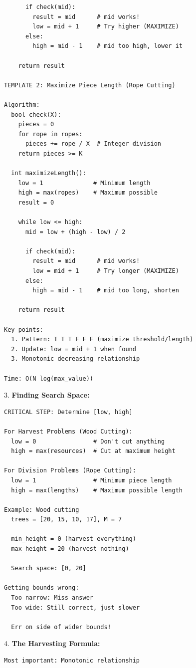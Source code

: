 \documentclass[11pt,a4paper,oneside]{book}
\begin{document}
\begin{tcolorbox}[
    enhanced,breakable,
    colback=white,
    colframe=deepblue,
    boxrule=1.5pt,
    arc=3mm,
    title=\textbf{The Harvesting and Division Paradigm}
]
\begin{verbatim}
      if check(mid):
        result = mid      # mid works!
        low = mid + 1     # Try higher (MAXIMIZE)
      else:
        high = mid - 1    # mid too high, lower it
    
    return result

TEMPLATE 2: Maximize Piece Length (Rope Cutting)

Algorithm:
  bool check(X):
    pieces = 0
    for rope in ropes:
      pieces += rope / X  # Integer division
    return pieces >= K
  
  int maximizeLength():
    low = 1              # Minimum length
    high = max(ropes)    # Maximum possible
    result = 0
    
    while low <= high:
      mid = low + (high - low) / 2
      
      if check(mid):
        result = mid      # mid works!
        low = mid + 1     # Try longer (MAXIMIZE)
      else:
        high = mid - 1    # mid too long, shorten
    
    return result

Key points:
  1. Pattern: T T T F F F (maximize threshold/length)
  2. Update: low = mid + 1 when found
  3. Monotonic decreasing relationship

Time: O(N log(max_value))
\end{verbatim}

3. \textbf{Finding Search Space:}
\begin{verbatim}
CRITICAL STEP: Determine [low, high]

For Harvest Problems (Wood Cutting):
  low = 0                # Don't cut anything
  high = max(resources)  # Cut at maximum height

For Division Problems (Rope Cutting):
  low = 1                # Minimum piece length
  high = max(lengths)    # Maximum possible length

Example: Wood cutting
  trees = [20, 15, 10, 17], M = 7
  
  min_height = 0 (harvest everything)
  max_height = 20 (harvest nothing)
  
  Search space: [0, 20]

Getting bounds wrong:
  Too narrow: Miss answer
  Too wide: Still correct, just slower
  
  Err on side of wider bounds!
\end{verbatim}

4. \textbf{The Harvesting Formula:}
\begin{verbatim}
Most important: Monotonic relationship


\end{verbatim}
\end{tcolorbox}
\end{document}
